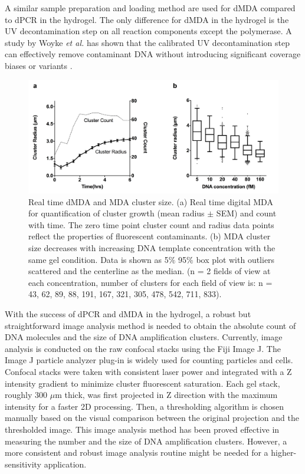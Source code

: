 A similar sample preparation and loading method are used for dMDA compared to dPCR in the hydrogel. The only difference for dMDA in the hydrogel is the UV decontamination step on all reaction components except the polymerase. A study by Woyke \textit{et al.} has shown that the calibrated UV decontamination step can effectively remove contaminant DNA without introducing significant coverage biases or variants \cite{Woyke:2011eg}. 

\begin{figure}
\includegraphics[keepaspectratio,width=1\textwidth]{./figures/Supp1_4.png}
\caption[Real time dMDA and MDA cluster size]{Real time dMDA and MDA cluster size. (a) Real time digital MDA for quantification of cluster growth (mean radius $\pm$ SEM) and count with time. The zero time point cluster count and radius data points reflect the properties of fluorescent contaminants. (b) MDA cluster size decreases with increasing DNA template concentration with the same gel condition. Data is shown as 5$\%$ {\textendash} 95$\%$ box plot with outliers scattered and the centerline as the median. (n = 2 fields of view at each concentration, number of clusters for each field of view is: n = 43, 62, 89, 88, 191, 167, 321, 305, 478, 542, 711, 833).}
\label{fig:dMDA_Quant}
\end{figure}

With the success of dPCR and dMDA in the hydrogel, a robust but straightforward image analysis method is needed to obtain the absolute count of DNA molecules and the size of DNA amplification clusters. Currently, image analysis is conducted on the raw confocal stacks using the Fiji Image J. The Image J particle analyzer plug-in is widely used for counting particles and cells. Confocal stacks were taken with consistent laser power and integrated with a Z intensity gradient to minimize cluster fluorescent saturation. Each gel stack, roughly 300 $\mu$m thick, was first projected in Z direction with the maximum intensity for a faster 2D processing. Then, a thresholding algorithm is chosen manually based on the visual comparison between the original projection and the thresholded image. This image analysis method has been proved effective in measuring the number and the size of DNA amplification clusters. However, a more consistent and robust image analysis routine might be needed for a higher-sensitivity application. 

